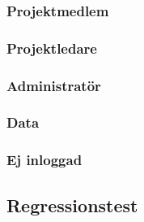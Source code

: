 \documentclass[a4paper]{article}
\begin{document}
\begin{ST}
\subsubsection{Projektmedlem}
\subsubsection{Projektledare}
\subsubsection{Administratör}
\subsubsection{Data}
\subsubsection{Ej inloggad}

\end{ST}
\subsection{Regressionstest}
\end{document}
